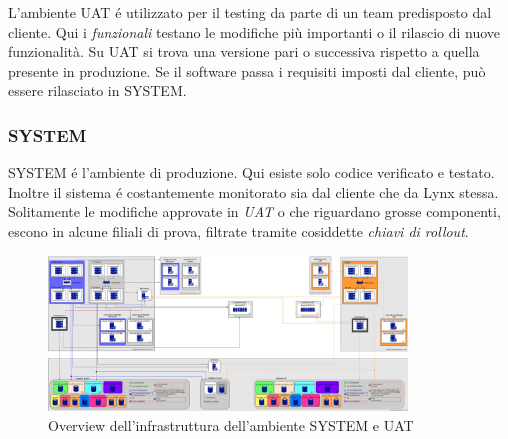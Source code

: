 L'ambiente UAT é utilizzato per il testing da parte di un team predisposto dal cliente. Qui i \textit{funzionali} testano le modifiche più importanti o il rilascio di nuove funzionalità. Su UAT si trova una versione pari o successiva rispetto a quella presente in produzione. Se il software passa i requisiti imposti dal cliente, può essere rilasciato in SYSTEM.

\subsubsection{SYSTEM}

SYSTEM é l'ambiente di produzione. Qui esiste solo codice verificato e testato. Inoltre il sistema é costantemente monitorato sia dal cliente che da Lynx stessa.  \\
Solitamente le modifiche approvate in \textit{UAT} o che riguardano grosse componenti, escono in alcune filiali di prova, filtrate tramite cosiddette \textit{chiavi di rollout}.  

\begin{figure}[!ht]
    \centering
	\includegraphics[width=0.85\textwidth]{./res/img/SchemiAmbienti_SYSTEM-UAT_v1.1.png}
    \caption{Overview dell'infrastruttura dell'ambiente SYSTEM e UAT}
\end{figure}


